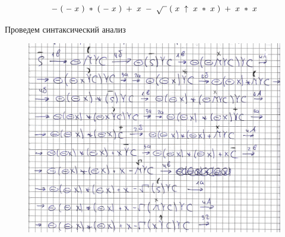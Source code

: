 \documentclass[a4paper, 14pt]{extarticle}
\begin{document}
\begin{equation*}
    - \hspace{3pt} ( \hspace{3pt} - \hspace{3pt} x \hspace{3pt} ) \hspace{3pt} * \hspace{3pt} ( \hspace{3pt} - \hspace{3pt} x \hspace{3pt} ) \hspace{3pt} + \hspace{3pt} x \hspace{3pt} - \hspace{3pt} \sqrt{\hphantom{1}} \hspace{3pt} ( \hspace{3pt} x \hspace{3pt} \uparrow \hspace{3pt} x \hspace{3pt} * \hspace{3pt} x \hspace{3pt} ) \hspace{3pt} + \hspace{3pt} x \hspace{3pt} * \hspace{3pt} x
\end{equation*}

Проведем синтаксический анализ

\begin{figure}[h]
    \centering
    \includegraphics[width=\textwidth,height=\textheight,keepaspectratio]{graphics/1-cropped}
\end{figure}
\end{document}
